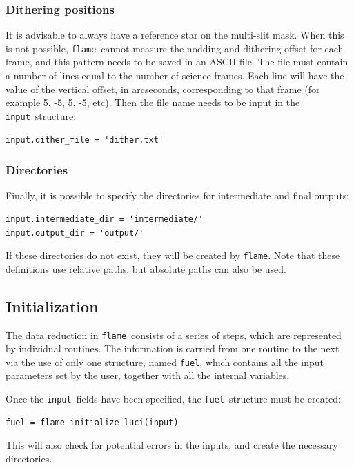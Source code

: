 \documentclass[a4paper]{article}
\newcommand{\flame}{\texttt{flame}}
\newcommand{\fuel}{\texttt{fuel}}
\newcommand{\inp}{\texttt{input}}
\begin{document}
\subsubsection{Dithering positions}
\label{sec:manual_dithering}
It is advisable to always have a reference star on the multi-slit mask. When this is not possible, \flame\ cannot measure the nodding and dithering offset for each frame, and this pattern needs to be saved in an ASCII file. The file must contain a number of lines equal to the number of science frames. Each line will have the value of the vertical offset, in arcseconds, corresponding to that frame (for example 5, -5, 5, -5, etc). Then the file name needs to be input in the \inp\ structure:
\begin{lstlisting}
input.dither_file = 'dither.txt'
\end{lstlisting}

\subsubsection{Directories}
Finally, it is possible to specify the directories for intermediate and final outputs:
\begin{lstlisting}
input.intermediate_dir = 'intermediate/'
input.output_dir = 'output/'
\end{lstlisting}
If these directories do not exist, they will be created by \flame. Note that these definitions use relative paths, but absolute paths can also be used.



\subsection{Initialization}

The data reduction in \flame\ consists of a series of steps, which are represented by individual routines. The information is carried from one routine to the next via the use of only one structure, named \fuel, which contains all the input parameters set by the user, together with all the internal variables.

Once the \inp\ fields have been specified, the \fuel\ structure must be created:
\begin{lstlisting}
fuel = flame_initialize_luci(input)
\end{lstlisting}
This will also check for potential errors in the inputs, and create the necessary directories.
\end{document}
